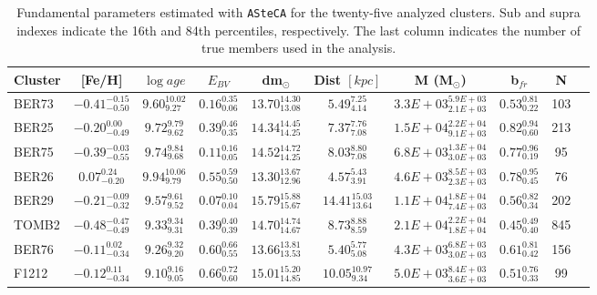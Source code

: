 \documentclass[referee]{aa}
\begin{document}
  \begin{table}
  \caption{Fundamental parameters estimated with \texttt{ASteCA} for the
  twenty-five analyzed clusters. Sub and supra indexes
  indicate the 16th and 84th percentiles, respectively. The last column
  indicates the number of true members used in the analysis.}
  \label{tab:results}
  \centering
  \begin{tabular}{lccccccccc}
  \hline\hline
  Cluster  & [Fe/H] & $\log{age}$ & $E_{BV}$ & dm$_{\odot}$ & Dist $[kpc]$ & M (M$_{\odot}$) & b$_{fr}$ & N\\
  \hline %
    BER73 & $-0.41_{-0.50}^{-0.15}$ & $9.60_{9.27}^{10.02}$ &
    $0.16_{0.06}^{0.35}$ & $13.70_{13.08}^{14.30}$ & $5.49_{4.14}^{7.25}$ &
    $3.3E+03_{2.1E+03}^{5.9E+03}$ & $0.53_{0.22}^{0.81}$ & 103 \\[.2cm]
    BER25 & $-0.20_{-0.49}^{0.00}$ & $9.72_{9.62}^{9.79}$ &
    $0.39_{0.35}^{0.46}$ & $14.34_{14.25}^{14.45}$ & $7.37_{7.08}^{7.76}$ &
    $1.5E+04_{9.1E+03}^{2.2E+04}$ & $0.82_{0.60}^{0.94}$ & 213 \\[.2cm]
    BER75 & $-0.39_{-0.55}^{-0.03}$ & $9.74_{9.68}^{9.84}$ &
    $0.11_{0.05}^{0.16}$ & $14.52_{14.25}^{14.72}$ & $8.03_{7.08}^{8.80}$ &
    $6.8E+03_{3.0E+03}^{1.3E+04}$ & $0.77_{0.19}^{0.96}$ & 95 \\[.2cm]
    BER26 & $0.07_{-0.20}^{0.24}$ & $9.94_{9.79}^{10.06}$ &
    $0.55_{0.50}^{0.59}$ & $13.30_{12.96}^{13.67}$ & $4.57_{3.91}^{5.43}$ &
    $4.6E+03_{2.3E+03}^{8.5E+03}$ & $0.78_{0.45}^{0.95}$ & 76 \\[.2cm]
    BER29 & $-0.21_{-0.32}^{-0.09}$ & $9.57_{9.52}^{9.61}$ &
    $0.07_{0.04}^{0.10}$ & $15.79_{15.67}^{15.88}$ & $14.41_{13.64}^{15.03}$ &
    $1.1E+04_{7.4E+03}^{1.8E+04}$ & $0.56_{0.34}^{0.82}$ & 202 \\[.2cm]
    TOMB2 & $-0.48_{-0.49}^{-0.47}$ & $9.33_{9.31}^{9.34}$ &
    $0.39_{0.39}^{0.40}$ & $14.70_{14.67}^{14.74}$ & $8.73_{8.59}^{8.88}$ &
    $2.1E+04_{1.8E+04}^{2.2E+04}$ & $0.45_{0.40}^{0.49}$ & 845 \\[.2cm]
    BER76 & $-0.11_{-0.34}^{0.02}$ & $9.26_{9.20}^{9.32}$ &
    $0.60_{0.55}^{0.66}$ & $13.66_{13.53}^{13.81}$ & $5.40_{5.08}^{5.77}$ &
    $4.3E+03_{3.0E+03}^{6.8E+03}$ & $0.61_{0.42}^{0.81}$ & 156 \\[.2cm]
    F1212 & $-0.12_{-0.34}^{0.11}$ & $9.10_{9.05}^{9.16}$ &
    $0.66_{0.60}^{0.72}$ & $15.01_{14.85}^{15.20}$ & $10.05_{9.34}^{10.97}$ &
    $5.0E+03_{3.6E+03}^{8.4E+03}$ & $0.51_{0.33}^{0.76}$ & 99 \\[.2cm]

\end{tabular}
\end{table}
\end{document}
